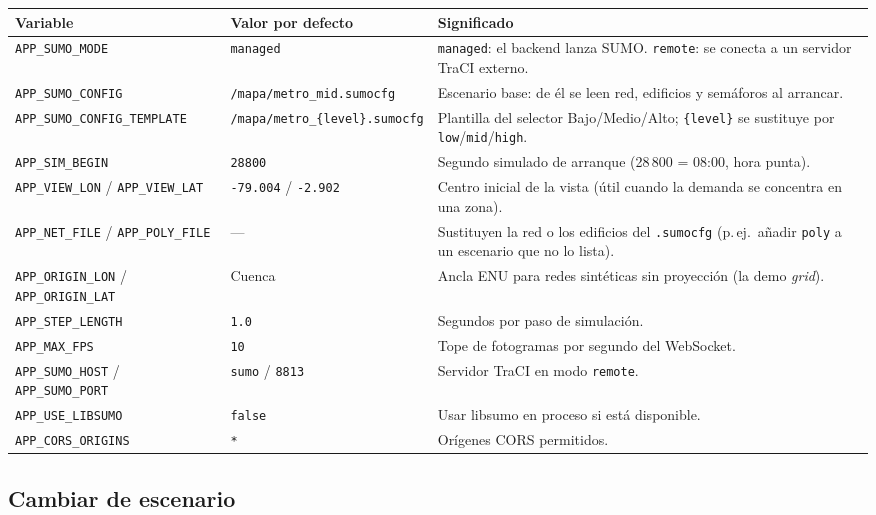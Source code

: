 \documentclass[11pt,a4paper]{article}
\begin{document}
\begin{longtable}{@{}p{5.3cm}p{2.9cm}p{6.2cm}@{}}
\toprule
\textbf{Variable} & \textbf{Valor por defecto} & \textbf{Significado} \\
\midrule
\texttt{APP\_SUMO\_MODE} & \texttt{managed} & \texttt{managed}: el backend lanza
  SUMO. \texttt{remote}: se conecta a un servidor TraCI externo. \\
\texttt{APP\_SUMO\_CONFIG} & \texttt{/mapa/metro\_mid.sumocfg} & Escenario base:
  de él se leen red, edificios y semáforos al arrancar. \\
\texttt{APP\_SUMO\_CONFIG\_TEMPLATE} & \texttt{/mapa/metro\_\{level\}.sumocfg} &
  Plantilla del selector Bajo/Medio/Alto; \texttt{\{level\}} se sustituye por
  \texttt{low}/\texttt{mid}/\texttt{high}. \\
\texttt{APP\_SIM\_BEGIN} & \texttt{28800} & Segundo simulado de arranque
  (28\,800 = 08:00, hora punta). \\
\texttt{APP\_VIEW\_LON} / \texttt{APP\_VIEW\_LAT} & \texttt{-79.004} /
  \texttt{-2.902} & Centro inicial de la vista (útil cuando la demanda se
  concentra en una zona). \\
\texttt{APP\_NET\_FILE} / \texttt{APP\_POLY\_FILE} & --- & Sustituyen la red o
  los edificios del \texttt{.sumocfg} (p.\,ej.\ añadir \texttt{poly} a un
  escenario que no lo lista). \\
\texttt{APP\_ORIGIN\_LON} / \texttt{APP\_ORIGIN\_LAT} & Cuenca & Ancla ENU para
  redes sintéticas sin proyección (la demo \emph{grid}). \\
\texttt{APP\_STEP\_LENGTH} & \texttt{1.0} & Segundos por paso de simulación. \\
\texttt{APP\_MAX\_FPS} & \texttt{10} & Tope de fotogramas por segundo del
  WebSocket. \\
\texttt{APP\_SUMO\_HOST} / \texttt{APP\_SUMO\_PORT} & \texttt{sumo} /
  \texttt{8813} & Servidor TraCI en modo \texttt{remote}. \\
\texttt{APP\_USE\_LIBSUMO} & \texttt{false} & Usar libsumo en proceso si está
  disponible. \\
\texttt{APP\_CORS\_ORIGINS} & \texttt{*} & Orígenes CORS permitidos. \\
\bottomrule
\end{longtable}

\subsection{Cambiar de escenario}
\end{document}
